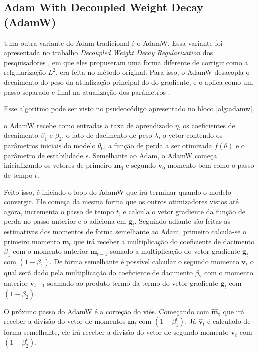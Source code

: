 \subsection{Adam With Decoupled Weight Decay (AdamW)}

Uma outra variante do Adam tradicional é o AdamW. Essa variante foi apresentada no trabalho \textit{Decoupled Weight Decay Regularization} dos pesquisadores \textcite{AdamWMethod}, em que eles propuseram uma forma diferente de corrigir como a relgularização $L^2$, era feita no método original. Para isso, o AdamW desacopla o decaimento do peso da atualização principal do do gradiente, e o aplica como um passo separado e final na atualização dos parâmetros \parencite{AdamWMethod}.

Esse algoritmo pode ser visto no psudeocódigo apresentado no bloco \ref{alg:adamw}.

o AdamW recebe como entradas a taxa de aprendizado $\eta$, os coeficientes de decaimento $\beta_1$ e $\beta_2$, o fato de dacimento de peso $\lambda$, o vetor contendo os parâmetros iniciais do modelo $\theta_0$, a função de perda a ser otimizada $f(\theta)$ e o parâmetro de estabilidade $\epsilon$. Semelhante ao Adam, o AdamW começa inicializando os vetores de primeiro $\mathbf{m}_0$ e segundo $\mathbf{v}_0$ momento bem como o passo de tempo $t$.

Feito isso, é iniciado o loop do AdamW que irá terminar quando o modelo convergir. Ele começa da mesma forma que os outros otimizadores vistos até agora, incrementa o passo de tempo $t$, e calcula o vetor gradiente da função de perda no passo anterior e o adiciona em $\mathbf{g}_t$. Seguindo adiante são feitas as estimativas dos momentos de forma semelhante ao Adam, primeiro calcula-se o primeiro momento $\mathbf{m}_t$ que irá receber a multiplicação do coeficiente de dacimento $\beta_1$ com o momento anterior $\mathbf{m}_{t-1}$ somado a multiplicação do vetor gradiente $\mathbf{g}_t$ com $(1 - \beta_1)$. De forma semelhante é possível calcular o segundo momento $\mathbf{v}_t$ o qual será dado pela multiplicação do coeficiente de dacimento $\beta_2$ com o momento anterior $\mathbf{v}_{t-1}$ soamado ao produto termo da termo do vetor gradiente $\mathbf{g}_t$ com $(1 - \beta_2)$.

O próximo passo do AdamW é a correção do viés. Começando com $\mathbf{\hat{m}_t}$ que irá receber a divisão do vetor de momentos $\mathbf{m}_t$ com $(1 - \beta_1^t)$. Já $\mathbf{\hat{v}}_t$ é calculado de forma semelhante, ele irá receber a divisão do vetor de segundo momento $\mathbf{v}_t$ com $(1 - \beta_2^t)$.

